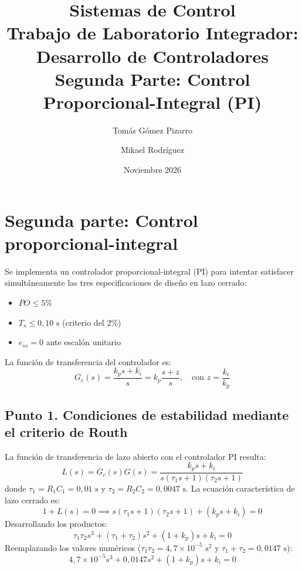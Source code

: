 \documentclass[11pt,a4paper]{article}
\title{
    \vspace{-1.2cm}
    \textbf{Sistemas de Control}\\
    \large Trabajo de Laboratorio Integrador: Desarrollo de Controladores\\
    \normalsize Segunda Parte: Control Proporcional-Integral (PI)
}
\author{Tomás Gómez Pizarro \quad\and\quad Mikael Rodríguez}
\date{Noviembre 2026}
\begin{document}
\maketitle

\section*{Segunda parte: Control proporcional-integral}

Se implementa un controlador proporcional-integral (PI) para intentar satisfacer simultáneamente las tres especificaciones de diseño en lazo cerrado:
\begin{itemize}
    \item $PO \le 5\%$
    \item $T_s \le 0{,}10\text{ s}$ (criterio del $2\%$)
    \item $e_{ss} = 0$ ante escalón unitario
\end{itemize}

La función de transferencia del controlador es:
\begin{equation}
    G_c(s) = \frac{k_p s + k_i}{s} = k_p \frac{s + z}{s}, \quad \text{con } z = \frac{k_i}{k_p}
\end{equation}

\subsection*{Punto 1. Condiciones de estabilidad mediante el criterio de Routh}

La función de transferencia de lazo abierto con el controlador PI resulta:
\begin{equation}
    L(s) = G_c(s) G(s) = \frac{k_p s + k_i}{s (\tau_1 s + 1)(\tau_2 s + 1)}
\end{equation}
donde $\tau_1 = R_1 C_1 = 0{,}01\text{ s}$ y $\tau_2 = R_2 C_2 = 0{,}0047\text{ s}$. La ecuación característica de lazo cerrado es:
\begin{equation}
    1 + L(s) = 0 \implies s (\tau_1 s + 1)(\tau_2 s + 1) + (k_p s + k_i) = 0
\end{equation}
Desarrollando los productos:
\begin{equation}
    \tau_1 \tau_2 s^3 + (\tau_1 + \tau_2) s^2 + (1 + k_p) s + k_i = 0
\end{equation}
Reemplazando los valores numéricos ($\tau_1 \tau_2 = 4{,}7\times 10^{-5}\text{ s}^2$ y $\tau_1 + \tau_2 = 0{,}0147\text{ s}$):
\begin{equation}
    4{,}7\times 10^{-5} s^3 + 0{,}0147 s^2 + (1 + k_p) s + k_i = 0
\end{equation}
\end{document}

